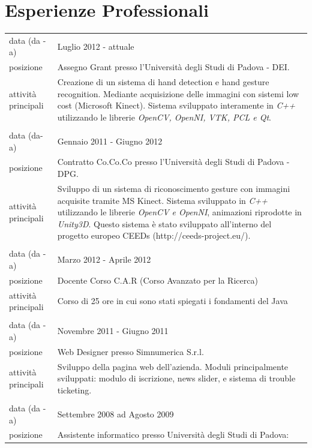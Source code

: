 \documentclass[pdftex,a4paper,10pt,twoside,titlepage,italian]{article}
\begin{document}
\section*{Esperienze Professionali}
\begin{tabular}[h]{l p{}}
\footnotesize{data (da - a)} & Luglio 2012 - attuale \\
\footnotesize{posizione} & Assegno Grant presso l'Università degli Studi di Padova - DEI.\\
\footnotesize{attività principali}& Creazione di un sistema di hand detection e hand gesture recognition.
Mediante acquisizione delle immagini con sistemi low cost (Microsoft Kinect). Sistema sviluppato interamente in 
\textit{C++} utilizzando le librerie \textit{OpenCV, OpenNI, VTK, PCL e Qt}.\\
 & \\
\footnotesize{data (da-a)} & Gennaio 2011 - Giugno 2012 \\
\footnotesize{posizione}& Contratto Co.Co.Co presso  l'Università degli Studi di Padova - DPG.\\
\footnotesize{attività principali} & Sviluppo di un sistema di riconoscimento gesture con immagini 
acquisite tramite MS Kinect. Sistema sviluppato 
 			in \textit{C++} utilizzando le librerie \textit{OpenCV e OpenNI}, animazioni riprodotte in \textit{Unity3D}. 
Questo sistema è stato sviluppato all'interno del progetto europeo CEEDs (http://ceeds-project.eu/).\\
& \\
\footnotesize{data (da - a)} & Marzo 2012 - Aprile 2012\\
\footnotesize{posizione} & Docente Corso C.A.R (Corso Avanzato per la Ricerca)\\
\footnotesize{attività principali} & Corso di 25 ore in cui sono stati spiegati i fondamenti del Java\\
& \\
\footnotesize{data (da - a)} & Novembre 2011 - Giugno 2011 \\
\footnotesize{posizione} & Web Designer presso Simnumerica S.r.l.\\
\footnotesize{attività principali}& Sviluppo della pagina web dell'azienda. Moduli principalmente sviluppati: modulo di 
		iscrizione, news slider, e sistema di trouble ticketing.\\
		& \\
\footnotesize{data (da - a)} & Settembre 2008 ad Agosto 2009 \\
\footnotesize{posizione} & Assistente informatico presso Università degli Studi di Padova: 

\end{tabular}
\end{document}

